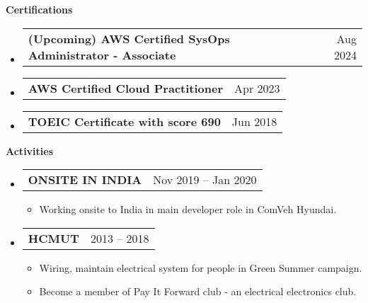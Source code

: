 \documentclass[letterpaper,12pt]{article}[leftmargin=*]
\makeatletter
\def \entryspacing {5pt}
\renewcommand{\section}[2]{\vspace{5pt}
  \colorbox{secondary}{\color{white}\raggedbottom\normalsize\textbf{{#1}{\hspace{7pt}#2}}}
}
\newcommand{\resumeEntryStart}{\begin{itemize}[leftmargin=2.5mm]}
\newcommand{\resumeEntryEnd}{\end{itemize}\vspace{\entryspacing}}
\newcommand{\resumeItemListStart}{\begin{itemize}[leftmargin=4.5mm]}
\newcommand{\resumeItemListEnd}{\end{itemize}}
\newcommand{\resumeItem}[1]{
  \item\small{
    {#1 \vspace{-2pt}}
  }
}
\newcommand{\resumeEntryTD}[2]{
  \vspace{1pt}\item[]
    \begin{tabularx}{0.97\textwidth}{X@{\hspace{60pt}}r}
      \textbf{\color{primary}#1} & {\firabook\color{accent}\small#2} \\
    \end{tabularx}\vspace{-6pt}
}
\makeatother
\begin{document}
\section{\faAward}{Certifications}
  \resumeEntryStart
    \resumeEntryTD
      {(Upcoming) AWS Certified SysOps Administrator - Associate}{Aug 2024}
  \resumeEntryEnd
  \vspace{-20pt}
  
  \resumeEntryStart
    \resumeEntryTD
      {AWS Certified Cloud Practitioner}{Apr 2023}
  \resumeEntryEnd
  \vspace{-20pt}
  
  \resumeEntryStart
    \resumeEntryTD
      {TOEIC Certificate with score 690}{Jun 2018}
  \resumeEntryEnd

\section{\faWalking}{Activities}
  \resumeEntryStart
    \resumeEntryTD
      {ONSITE IN INDIA}{Nov 2019 -- Jan 2020}
    \resumeItemListStart
      \resumeItem {Working onsite to India in main developer role in ComVeh Hyundai.}
    \resumeItemListEnd
  \resumeEntryEnd
  \vspace{-20pt}
  
  \resumeEntryStart
    \resumeEntryTD
      {HCMUT}{2013 -- 2018}
    \resumeItemListStart
      \resumeItem {Wiring, maintain electrical system for people in Green Summer campaign.}
      \resumeItem {Become a member of Pay It Forward club - an electrical electronics club.}
    \resumeItemListEnd
  \resumeEntryEnd
\end{document}
